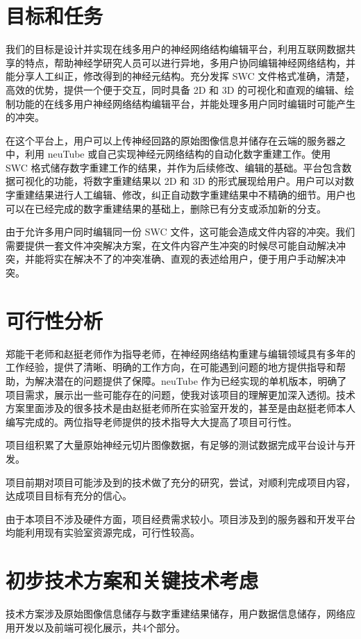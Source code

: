 \section{目标和任务}
我们的目标是设计并实现在线多用户的神经网络结构编辑平台，利用互联网数据共享的特点，帮助神经学研究人员可以进行异地，多用户协同编辑神经网络结构，并能分享人工纠正，修改得到的神经元结构。充分发挥 SWC 文件格式准确，清楚，高效的优势，提供一个便于交互，同时具备 2D 和 3D 的可视化和直观的编辑、绘制功能的在线多用户神经网络结构编辑平台，并能处理多用户同时编辑时可能产生的冲突。

在这个平台上，用户可以上传神经回路的原始图像信息并储存在云端的服务器之中，利用 neuTube 或自己实现神经元网络结构的自动化数字重建工作。使用 SWC 格式储存数字重建工作的结果，并作为后续修改、编辑的基础。平台包含数据可视化的功能，将数字重建结果以 2D 和 3D 的形式展现给用户。用户可以对数字重建结果进行人工编辑、修改，纠正自动数字重建结果中不精确的细节。用户也可以在已经完成的数字重建结果的基础上，删除已有分支或添加新的分支。

由于允许多用户同时编辑同一份 SWC 文件，这可能会造成文件内容的冲突。我们需要提供一套文件冲突解决方案，在文件内容产生冲突的时候尽可能自动解决冲突，并能将实在解决不了的冲突准确、直观的表述给用户，便于用户手动解决冲突。

\section{可行性分析}
郑能干老师和赵挺老师作为指导老师，在神经网络结构重建与编辑领域具有多年的工作经验，提供了清晰、明确的工作方向，在可能遇到问题的地方提供指导和帮助，为解决潜在的问题提供了保障。neuTube 作为已经实现的单机版本，明确了项目需求，展示出一些可能存在的问题，使我对该项目的理解更加深入透彻。技术方案里面涉及的很多技术是由赵挺老师所在实验室开发的，甚至是由赵挺老师本人编写完成的。两位指导老师提供的技术指导大大提高了项目可行性。

项目组积累了大量原始神经元切片图像数据，有足够的测试数据完成平台设计与开发。

项目前期对项目可能涉及到的技术做了充分的研究，尝试，对顺利完成项目内容，达成项目目标有充分的信心。

由于本项目不涉及硬件方面，项目经费需求较小。项目涉及到的服务器和开发平台均能利用现有实验室资源完成，可行性较高。

\section{初步技术方案和关键技术考虑}
技术方案涉及原始图像信息储存与数字重建结果储存，用户数据信息储存，网络应用开发以及前端可视化展示，共4个部分。

